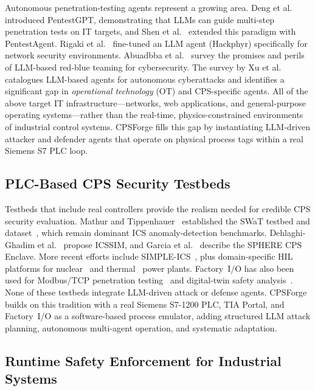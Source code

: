 Autonomous penetration-testing agents represent a growing area. Deng et al.~\cite{deng2024pentestgpt} introduced PentestGPT, demonstrating that LLMs can guide multi-step penetration tests on IT targets, and Shen et al.~\cite{shen2025pentestagent} extended this paradigm with PentestAgent. Rigaki et al.~\cite{rigaki2024hackphyr} fine-tuned an LLM agent (Hackphyr) specifically for network security environments. Abuadbba et al.~\cite{abuadbba2025promise} survey the promises and perils of LLM-based red-blue teaming for cybersecurity. The survey by Xu et al.~\cite{xu2025forewarned} catalogues LLM-based agents for autonomous cyberattacks and identifies a significant gap in \emph{operational technology} (OT) and CPS-specific agents. All of the above target IT infrastructure---networks, web applications, and general-purpose operating systems---rather than the real-time, physics-constrained environments of industrial control systems. CPSForge fills this gap by instantiating LLM-driven attacker and defender agents that operate on physical process tags within a real Siemens S7 PLC loop.

\subsection{PLC-Based CPS Security Testbeds}

Testbeds that include real controllers provide the realism needed for credible CPS security evaluation. Mathur and Tippenhauer~\cite{mathur2016swat} established the SWaT testbed and dataset~\cite{goh2017swat}, which remain dominant ICS anomaly-detection benchmarks. Dehlaghi-Ghadim et al.~\cite{dehlaghi2023icssim} propose ICSSIM, and Garcia et al.~\cite{garcia2025sphere} describe the SPHERE CPS Enclave. More recent efforts include SIMPLE-ICS~\cite{pramadi2026simpleics}, plus domain-specific HIL platforms for nuclear~\cite{chen2024nuclear_hil, nam2025hintsec} and thermal~\cite{mathew2024hil_thermal} power plants. Factory~I/O has also been used for Modbus/TCP penetration testing~\cite{lazaridis2023factoryio_pentest} and digital-twin safety analysis~\cite{wang2024factoryio_dt}. None of these testbeds integrate LLM-driven attack or defense agents. CPSForge builds on this tradition with a real Siemens S7-1200 PLC, TIA Portal, and Factory~I/O as a software-based process emulator, adding structured LLM attack planning, autonomous multi-agent operation, and systematic adaptation.

\subsection{Runtime Safety Enforcement for Industrial Systems}

